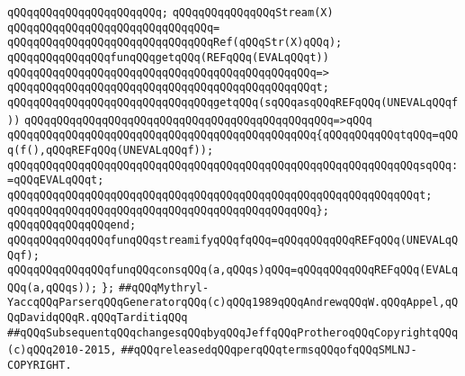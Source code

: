 \verb|qQQqqQQqqQQqqQQqqQQqqQQq;|\newline
\newline
\verb|qQQqqQQqqQQqqQQqStream(X)|\newline
\verb|qQQqqQQqqQQqqQQqqQQqqQQqqQQqqQQq=|\newline
\verb|qQQqqQQqqQQqqQQqqQQqqQQqqQQqqQQqRef(qQQqStr(X)qQQq);|\newline
\newline
\newline
\verb|qQQqqQQqqQQqqQQqfunqQQqgetqQQq(REFqQQq(EVALqQQqt))|\newline
\verb|qQQqqQQqqQQqqQQqqQQqqQQqqQQqqQQqqQQqqQQqqQQqqQQq=>|\newline
\verb|qQQqqQQqqQQqqQQqqQQqqQQqqQQqqQQqqQQqqQQqqQQqqQQqt;|\newline
\newline
\verb|qQQqqQQqqQQqqQQqqQQqqQQqqQQqqQQqgetqQQq(sqQQqasqQQqREFqQQq(UNEVALqQQqf))|\newline
\verb|qQQqqQQqqQQqqQQqqQQqqQQqqQQqqQQqqQQqqQQqqQQqqQQq=>qQQq|\newline
\verb|qQQqqQQqqQQqqQQqqQQqqQQqqQQqqQQqqQQqqQQqqQQqqQQq{qQQqqQQqqQQqtqQQq=qQQq(f(),qQQqREFqQQq(UNEVALqQQqf));|\newline
\verb|qQQqqQQqqQQqqQQqqQQqqQQqqQQqqQQqqQQqqQQqqQQqqQQqqQQqqQQqqQQqqQQqsqQQq:=qQQqEVALqQQqt;|\newline
\verb|qQQqqQQqqQQqqQQqqQQqqQQqqQQqqQQqqQQqqQQqqQQqqQQqqQQqqQQqqQQqqQQqt;|\newline
\verb|qQQqqQQqqQQqqQQqqQQqqQQqqQQqqQQqqQQqqQQqqQQqqQQq};|\newline
\verb|qQQqqQQqqQQqqQQqend;|\newline
\newline
\newline
\verb|qQQqqQQqqQQqqQQqfunqQQqstreamifyqQQqfqQQq=qQQqqQQqqQQqREFqQQq(UNEVALqQQqf);|\newline
\verb|qQQqqQQqqQQqqQQqfunqQQqconsqQQq(a,qQQqs)qQQq=qQQqqQQqqQQqREFqQQq(EVALqQQq(a,qQQqs));|\newline
\verb|};|\newline
\newline
\newline
\verb|##qQQqMythryl-YaccqQQqParserqQQqGeneratorqQQq(c)qQQq1989qQQqAndrewqQQqW.qQQqAppel,qQQqDavidqQQqR.qQQqTarditiqQQq|\newline
\verb|##qQQqSubsequentqQQqchangesqQQqbyqQQqJeffqQQqProtheroqQQqCopyrightqQQq(c)qQQq2010-2015,|\newline
\verb|##qQQqreleasedqQQqperqQQqtermsqQQqofqQQqSMLNJ-COPYRIGHT.|\newline


